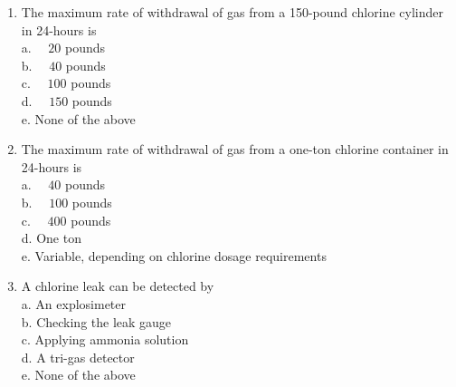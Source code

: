 \documentclass{article}
\begin{document}
\begin{enumerate}
\item The maximum rate of withdrawal of gas from a 150-pound chlorine cylinder in 24-hours is\\
a. $\quad 20$ pounds\\
b. $\quad 40$ pounds\\
c. $\quad 100$ pounds\\
d. $\quad 150$ pounds\\
e. None of the above\\
  \item The maximum rate of withdrawal of gas from a one-ton chlorine container in 24-hours is\\
a. $\quad 40$ pounds\\
b. $\quad 100$ pounds\\
c. $\quad 400$ pounds\\
d. One ton\\
e. Variable, depending on chlorine dosage requirements\\
  \item A chlorine leak can be detected by\\
a. An explosimeter\\
b. Checking the leak gauge\\
c. Applying ammonia solution\\
d. A tri-gas detector\\
e. None of the above\\


\end{enumerate}
\end{document}
